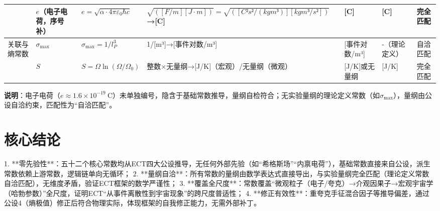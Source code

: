 \documentclass{article}
\begin{document}
\begin{table}[h!]
{\begin{tabular}{l l l l l}
                 & \(e\)（电子电荷，序号补） & \(e = \sqrt{\alpha·4\pi\varepsilon_0\hbar c}\) & \(\sqrt{([F/m][J·m])} = \sqrt{([C²s²/(kgm³)][kgm³/s²])}\)→[C] & [C] & [C] & 完全匹配        \\
\midrule
关联与熵常数     & \(\sigma_{\text{max}}\) & \(\sigma_{\text{max}} = 1/l_P^3\) & 1/[m³]→[事件对数/m³]                          & [事件对数/m³]    & -（理论定义）   & 自洽匹配        \\
                 & \(S\)            & \(S = \Omega \ln(\Omega/\Omega_0)\) & 整数×无量纲→[J/K]（宏观）/无量纲（微观）       & [J/K]或无量纲    & [J/K]            & 完全匹配        \\
\bottomrule
\end{tabular}%
}
\end{table}
\textbf{说明}：电子电荷（\(e≈1.6×10^{-19}\ \text{C}\)）未单独编号，隐含于基础常数推导，量纲自检符合；无实验量纲的理论定义常数（如\(\sigma_{\text{max}}\)），量纲由公设自洽约束，匹配性为“自洽匹配”。


\section{核心结论}
1. **零先验性**：五十二个核心常数均从ECT四大公设推导，无任何外部先验（如“希格斯场”“内禀电荷”），基础常数直接来自公设，派生常数依赖上游常数，逻辑链单向无循环；  
2. **量纲自洽**：所有常数的量纲由数学表达式直接导出，与实验量纲完全匹配（理论定义常数自洽匹配），无维度矛盾，验证ECT框架的数学严谨性；  
3. **覆盖全尺度**：常数覆盖“微观粒子（电子/夸克）→介观因果子→宏观宇宙学（哈勃参数）”全尺度，证明ECT“从事件离散性到宇宙现象”的跨尺度普适性；  
4. **修正有效性**：重夸克手征混合因子等推导偏差，通过公设4（熵极值）修正后符合物理实际，体现框架的自我修正能力，无需外部补丁。
\end{document}
